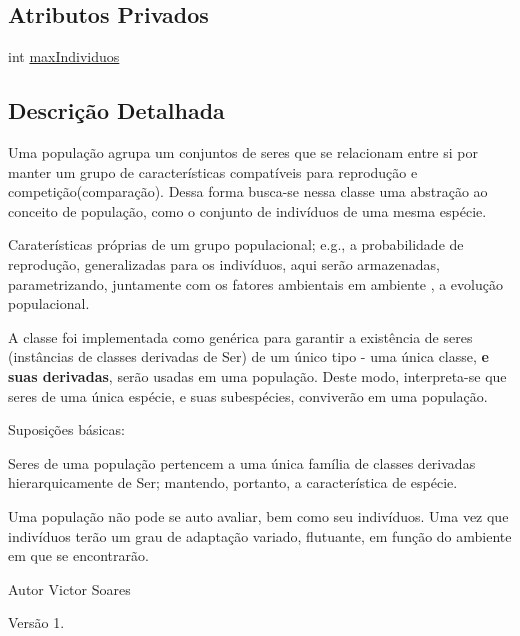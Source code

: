 \subsection*{Atributos Privados}
\begin{DoxyCompactItemize}
\item 
int \hyperlink{classic_1_1populacional_1_1_populacao_3_01_gextends_01_number_01_6_comparable_3_01_g_01_4_00_01_439c3806f66bccf03e2d51ecb538a0c8_afe0e065f83c9113fbfdc520d0ca28eac}{max\-Individuos}
\end{DoxyCompactItemize}


\subsection{Descrição Detalhada}
Uma {\ttfamily população} agrupa um conjuntos de {\ttfamily seres} que se relacionam entre si por manter um grupo de características compatíveis para reprodução e competição(comparação). Dessa forma busca-\/se nessa classe uma abstração ao conceito de população, como o conjunto de indivíduos de uma mesma espécie. 

Caraterísticas próprias de um grupo populacional; e.\-g., a probabilidade de reprodução, generalizadas para os indivíduos, aqui serão armazenadas, parametrizando, juntamente com os fatores ambientais em {\ttfamily ambiente} , a evolução populacional. 

A classe foi implementada como genérica para garantir a existência de seres (instâncias de classes derivadas de {\ttfamily Ser}) de um único tipo -\/ uma única classe, {\bfseries e suas derivadas}, serão usadas em uma {\ttfamily população}. Deste modo, interpreta-\/se que {\ttfamily seres} de uma única espécie, e suas subespécies, conviverão em uma {\ttfamily população}. 

Suposições básicas\-: 
\begin{DoxyItemize}
\item {\ttfamily Seres} de uma {\ttfamily população} pertencem a uma única família de classes derivadas hierarquicamente de {\ttfamily Ser}; mantendo, portanto, a característica de espécie.  
\item Uma {\ttfamily população} não pode se auto avaliar, bem como seu indivíduos. Uma vez que indivíduos terão um grau de adaptação variado, flutuante, em função do ambiente em que se encontrarão.  
\end{DoxyItemize}

\begin{DoxyAuthor}{Autor}
Victor Soares 
\end{DoxyAuthor}
\begin{DoxyVersion}{Versão}
1. 
\end{DoxyVersion}


